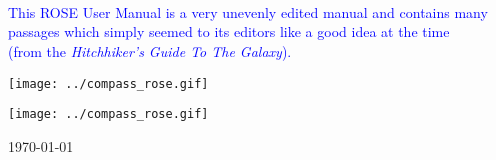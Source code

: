 \documentclass[10pt]{book}
\begin{document}
{          \\
          \\ \\
         \textcolor{blue}{This ROSE User Manual is a very unevenly edited manual and contains many} \\
         \textcolor{blue}{passages which simply seemed to its editors like a good idea at the time} \\
         \textcolor{blue}{(from the {\it Hitchhiker's Guide To The Galaxy}).}
       }

\label{Rose:postscriptVersionOfUserManual}

\begin{htmlonly}
   \centering \texttt{[image: ../compass\_rose.gif]}
\end{htmlonly}

\maketitle

\begin{htmlonly}
   \centering \texttt{[image: ../compass\_rose.gif]}
\end{htmlonly}

\begin{center}
\today
\end{center}

%


%


\tableofcontents
\listoffigures
\listoftables
\newpage
%







% 

% 
\end{document}
